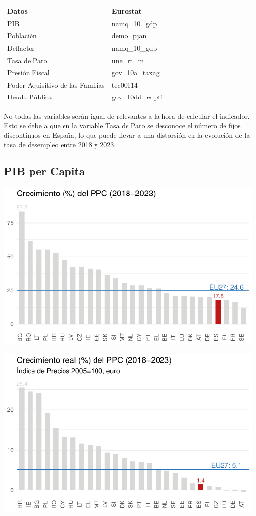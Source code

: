 \documentclass[
  letterpaper,
  DIV=11,
  numbers=noendperiod]{scrartcl}
\begin{document}
\begin{longtable}[]{@{}ll@{}}
\toprule\noalign{}
Datos & Eurostat \\
\midrule\noalign{}
\endhead
\bottomrule\noalign{}
\endlastfoot
PIB & namq\_10\_gdp \\
Población & demo\_pjan \\
Deflactor & namq\_10\_gdp \\
Tasa de Paro & une\_rt\_m \\
Presión Fiscal & gov\_10a\_taxag \\
Poder Aquisitivo de las Familias & tec00114 \\
Deuda Pública & gov\_10dd\_edpt1 \\
\end{longtable}

No todas las variables serán igual de relevantes a la hora de calcular
el indicador. Esto se debe a que en la variable Tasa de Paro se
desconoce el número de fijos discontinuos en España, lo que puede llevar
a una distorsión en la evolución de la tasa de desempleo entre 2018 y
2023.

\hypertarget{pib-per-capita}{%
\subsection{PIB per Capita}\label{pib-per-capita}}

\includegraphics{Trabajo_files/figure-pdf/unnamed-chunk-14-1.pdf}

\includegraphics{Trabajo_files/figure-pdf/unnamed-chunk-15-1.pdf}
\end{document}
